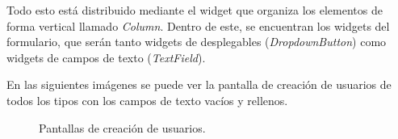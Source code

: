 Todo esto está distribuido mediante el widget que organiza los elementos de forma vertical llamado \textit{Column}. Dentro de este, se encuentran los widgets del formulario, que serán tanto widgets de desplegables (\textit{DropdownButton}) como widgets de campos de texto (\textit{TextField}).

En las siguientes imágenes se puede ver la pantalla de creación de usuarios de todos los tipos con los campos de texto vacíos y rellenos.


\begin{figure}[H]%
  \centering
  \qquad
  \caption{Pantallas de creación de usuarios.}%
  \label{fig:example}%
\end{figure}



